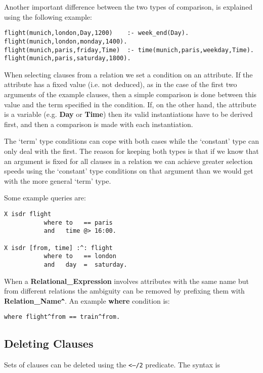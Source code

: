 Another important difference between the two types of
comparison, is explained using the following example:

\begin{verbatim}
flight(munich,london,Day,1200)    :- week_end(Day).
flight(munich,london,monday,1400).
flight(munich,paris,friday,Time)  :- time(munich,paris,weekday,Time).
flight(munich,paris,saturday,1800).
\end{verbatim}

When selecting clauses from a relation we set a condition on an attribute.  
If the attribute has a fixed value (i.e. not deduced), as in the case of 
the first two arguments of the example clauses, then a simple comparison is 
done between this value and the term specified in the condition.
If, on the other hand, the attribute is a variable (e.g. {\bf Day} or 
{\bf Time}) then its valid instantiations have to be derived first, and 
then a comparison is made with each instantiation.

The `term' type conditions can cope with both cases while the `constant' 
type can only deal with the first. The reason for keeping both types is 
that if we know that an argument is fixed for all clauses in a relation we 
can achieve greater selection speeds using the `constant' type conditions 
on that argument than we would get with the more general `term' type.

Some example queries are:

\begin{verbatim}
X isdr flight
           where to   == paris
           and   time @> 16:00.

X isdr [from, time] :^: flight 
           where to   == london 
           and   day  =  saturday. 
\end{verbatim}

When a {\bf Relational\_Expression} involves attributes with the same name 
but from different relations the ambiguity can be removed by
prefixing them with {\bf Relation\_Name\verb+^+}. An example {\bf where} 
condition is:

\begin{verbatim}
where flight^from == train^from.
\end{verbatim}

\subsection{Deleting Clauses}
Sets of clauses can be deleted using the {\tt <---/2} predicate.
The syntax is

